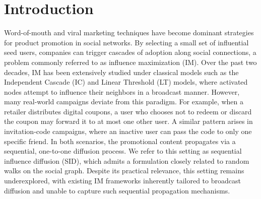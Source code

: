 \documentclass[sigconf]{acmart}
\begin{document}


\maketitle

\section{Introduction}
\label{sec:intro}
Word-of-mouth and viral marketing techniques have become dominant strategies for product promotion in social networks. By selecting a small set of influential seed users, companies can trigger cascades of adoption along social connections, a problem commonly referred to as influence maximization (IM). Over the past two decades, IM has been extensively studied under classical models such as the Independent Cascade (IC) and Linear Threshold (LT) models, where activated nodes attempt to influence their neighbors in a broadcast manner. However, many real-world campaigns deviate from this paradigm. For example, when a retailer distributes digital coupons, a user who chooses not to redeem or discard the coupon may forward it to at most one other user. A similar pattern arises in invitation-code campaigns, where an inactive user can pass the code to only one specific friend. In both scenarios, the promotional content propagates via a sequential, one-to-one diffusion process. We refer to this setting as sequential influence diffusion (SID), which admits a formulation closely related to random walks on the social graph. Despite its practical relevance, this setting remains underexplored, with existing IM frameworks inherently tailored to broadcast diffusion and unable to capture such sequential propagation mechanisms.
\end{document}
